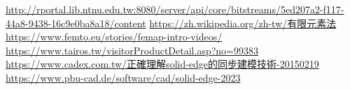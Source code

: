 \newpage
\renewcommand\bibname{參~考~文~獻}
\begin{thebibliography}{99}  %
\href{http://rportal.lib.ntnu.edu.tw:8080/server/api/core/bitstreams/5ed207a2-f117-44a8-9438-16c9e0ba8a18/content}{http://rportal.lib.ntnu.edu.tw:8080/server/api/core/bitstreams/5ed207a2-f117-44a8-9438-16c9e0ba8a18/content}
\href{https://zh.wikipedia.org/zh-tw/有限元素法}{https://zh.wikipedia.org/zh-tw/有限元素法}
\href{https://www.femto.eu/stories/femap-intro-videos/}{https://www.femto.eu/stories/femap-intro-videos/}
\href{https://www.tairos.tw/visitorProductDetail.asp?no=99383}{https://www.tairos.tw/visitorProductDetail.asp?no=99383}
\href{https://www.cadex.com.tw/正確理解solid-edge的同步建模技術-20150219}{https://www.cadex.com.tw/正確理解solid-edge的同步建模技術-20150219}
\href{https://www.pbu-cad.de/software/cad/solid-edge-2023}{https://www.pbu-cad.de/software/cad/solid-edge-2023}

\end{thebibliography}
\newpage